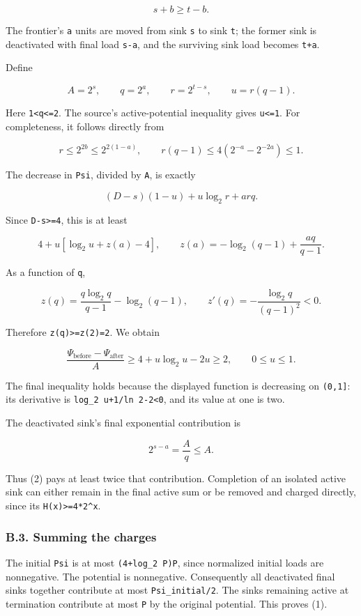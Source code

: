 \[
s+b\ge t-b.
\]

The frontier's \texttt{a} units are moved from sink \texttt{s} to sink \texttt{t}; the former sink is deactivated with final load \texttt{s-a}, and the surviving sink load becomes \texttt{t+a}.

Define

\[
A=2^s,\qquad q=2^a,\qquad r=2^{t-s},\qquad u=r(q-1).
\]

Here \texttt{1\textless{}q\textless{}=2}. The source's active-potential inequality gives \texttt{u\textless{}=1}. For completeness, it follows directly from

\[
r\le2^{2b}\le2^{2(1-a)},\qquad r(q-1)\le4(2^{-a}-2^{-2a})\le1.
\]

The decrease in \texttt{Psi}, divided by \texttt{A}, is exactly

\[
(D-s)(1-u)+u\log_2r+arq.
\]

Since \texttt{D-s\textgreater{}=4}, this is at least

\[
4+u[\log_2u+z(a)-4],\qquad z(a)=-\log_2(q-1)+\frac{aq}{q-1}.
\]

As a function of \texttt{q},

\[
z(q)=\frac{q\log_2q}{q-1}-\log_2(q-1),\qquad z'(q)=-\frac{\log_2q}{(q-1)^2}<0.
\]

Therefore \texttt{z(q)\textgreater{}=z(2)=2}. We obtain

\[
\frac{\Psi_{\mathrm{before}}-\Psi_{\mathrm{after}}}{A}\ge4+u\log_2u-2u\ge2,\qquad0\le u\le1.\tag{2}
\]

The final inequality holds because the displayed function is decreasing on \texttt{(0,1{]}}: its derivative is \texttt{log\_2\ u+1/ln\ 2-2\textless{}0}, and its value at one is two.

The deactivated sink's final exponential contribution is

\[
2^{s-a}=\frac Aq\le A.
\]

Thus (2) pays at least twice that contribution. Completion of an isolated active sink can either remain in the final active sum or be removed and charged directly, since its \texttt{H(x)\textgreater{}=4*2\^{}x}.

\hypertarget{af-385fd70686-b.3.-summing-the-charges}{%
\subsubsection{B.3. Summing the charges}\label{af-385fd70686-b.3.-summing-the-charges}}

The initial \texttt{Psi} is at most \texttt{(4+log\_2\ P)P}, since normalized initial loads are nonnegative. The potential is nonnegative. Consequently all deactivated final sinks together contribute at most \texttt{Psi\_initial/2}. The sinks remaining active at termination contribute at most \texttt{P} by the original potential. This proves (1).

